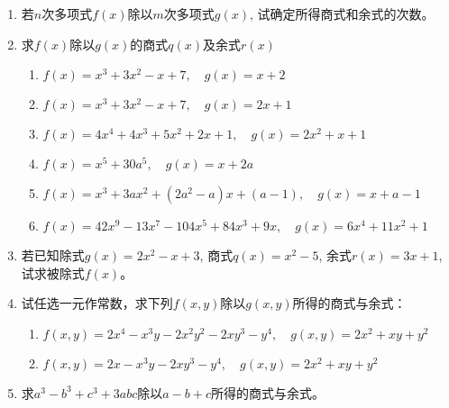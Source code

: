 \begin{ex}
\begin{enumerate}
    \item 若$n$次多项式$f(x)$除以$m$次多项式$g(x)$, 试确定所得商式和余式的次数。
    \item 求$f(x)$除以$g(x)$的商式$q(x)$及余式$r(x)$
\begin{enumerate}
    \item $f(x)=x^3+3x^2-x+7,\quad g(x)=x+2$
    \item $f(x)=x^3+3x^2-x+7,\quad g(x)=2x+1$
    \item $f(x)=4x^4+4x^3+5x^2+2x+1,\quad 
g (x) =2x^2+x+1$
    \item $f (x) =x^5+30a^5,\quad g (x) =x+2a$
    \item $f(x)=x^3+3ax^2+(2a^2 -a)x+(a-1),\quad g (x) =x+a-1$
    \item $f(x)=42x^9-13x^7-104x^5+84x^3+9x,\quad 
g (x) =6x^4+11x^2+1$
\end{enumerate}
\item 
若已知除式$g(x)=2x^2-x+3$, 商式$q(x)=x^2-5$, 余式$r(x)=3x+1$, 试求被除式$f(x)$。

\item 试任选一元作常数，求下列$f(x,y)$除以$g(x,y)$所得的商式与余式：
\begin{enumerate}
    \item $f (x,y) =2x^4-x^3y-2x^2y^2-2xy^3-y^4,\quad 
g (x,y) =2x^2+xy+y^2$
    \item $f(x,y)=2x-x^3y-2xy^3-y^4,\quad 
g (x,y) =2x^2+xy+y^2$
\end{enumerate}

\item 求$a^3-b^3+c^3+3abc$除以$a-b+c$所得的商式与余式。
\end{enumerate}
\end{ex}

